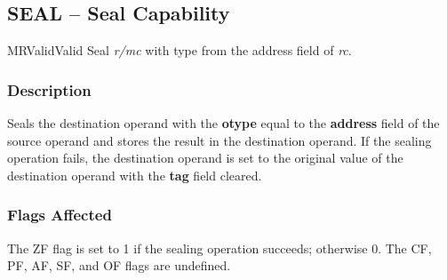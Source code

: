 \clearpage
{}
{}
\subsection*{SEAL -- Seal Capability}

\begin{x86opcodetable}
  {MR}{Valid}{Valid}
  {Seal \emph{r/mc} with type from the address field of \emph{rc}.}
\end{x86opcodetable}

\begin{x86opentable}
\end{x86opentable}

\subsubsection*{Description}

Seals the destination operand with the \textbf{otype} equal to the
\textbf{address} field of the source operand and stores the result in
the destination operand.  If the sealing operation fails, the
destination operand is set to the original value of the destination
operand with the \textbf{tag} field cleared.

\subsubsection*{Flags Affected}

The ZF flag is set to 1 if the sealing operation succeeds; otherwise
0.  The CF, PF, AF, SF, and OF flags are undefined.
